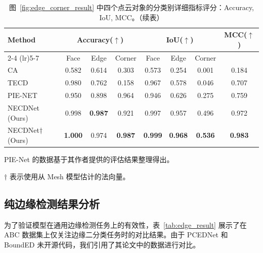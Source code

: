 \begin{table}[ht]
    \small
    \centering
    \setlength{\tabcolsep}{10pt}
    \caption{图~\ref{fig:edge_corner_result} 中四个点云对象的分类别详细指标评分：Accuracy, IoU, MCC。（续表）}
    \label{tab:metrics_result_part2}
    \begin{threeparttable}
        
        \begin{tabular}{l ccc ccc c}
        \toprule
        Method & \multicolumn{3}{c}{Accuracy($\uparrow$)} & \multicolumn{3}{c}{IoU($\uparrow$)} & MCC($\uparrow$) \\
        \cmidrule(lr){2-4} \cmidrule(lr){5-7} 
         & Face & Edge & Corner & Face & Edge & Corner & \\
        \midrule
        CA~\cite{bazazian_fast_2015} & 0.582 & 0.614 & 0.303 & 0.573 & 0.254 & 0.001 & 0.184 \\
        TECD~\cite{ahmed_edge_2018} & 0.980 & 0.762 & 0.158 & 0.967 & 0.578 & 0.046 & 0.707 \\
        PIE-NET~\cite{wang_pienet_2020a} & 0.950 & 0.898 & 0.964 & 0.946 & 0.626 & 0.275 & 0.759 \\
        NECDNet (Ours) & 0.998 & \textbf{0.987}& 0.921 & 0.997 & 0.957 & 0.496 & 0.972 \\
        NECDNet$\dagger$ (Ours) & \textbf{1.000}& 0.974 & \textbf{0.987}& \textbf{0.999}& \textbf{0.968}& \textbf{0.536}& \textbf{0.983}\\
        \bottomrule
        \end{tabular}
        \begin{tablenotes}
            \footnotesize
            \item PIE-Net 的数据基于其作者提供的评估结果整理得出。
            \item $\dagger$ 表示使用从 Mesh 模型估计的法向量。 
         \end{tablenotes}
    \end{threeparttable}
\end{table}

\subsection{纯边缘检测结果分析}

为了验证模型在通用边缘检测任务上的有效性，表~\ref{tab:edge_result} 展示了在 ABC 数据集上仅关注边缘二分类任务时的对比结果。由于 PCEDNet 和 BoundED 未开源代码，我们引用了其论文中的数据进行对比。

